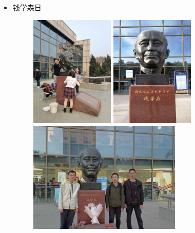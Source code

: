 \documentclass[
decoration,  %
]{qyxf-book}
\begin{document}
	
	\begin{itemize}
		
		\item 钱学森日
			\begin{figure}[H]
        		\centering
        		\begin{minipage}{4cm}
        		\includegraphics[width=4cm]{pics/qxsr1.png}
        		\end{minipage}
        		\begin{minipage}{4cm}
        		\includegraphics[width=4cm]{pics/qxsr2.png}
        		\end{minipage}
				\begin{minipage}{7.3cm}
        		\includegraphics[width=7.3cm]{pics/qxsr3.png}
				\end{minipage}
        	\end{figure}
		

\end{itemize}
\end{document}
